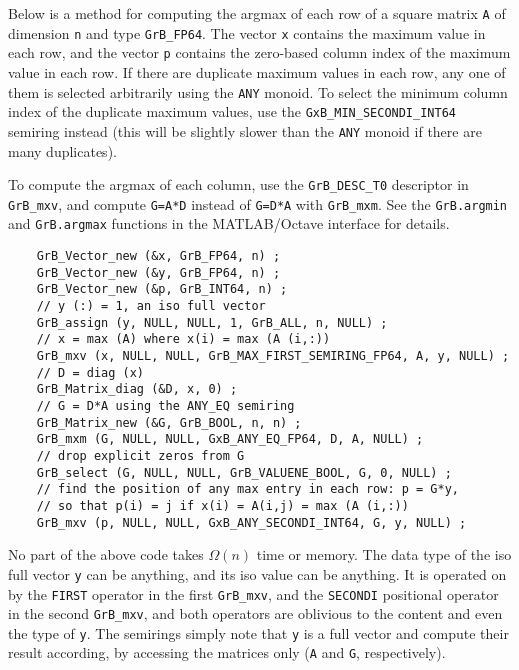 \documentclass[12pt]{article}
\begin{document}
Below is a method for computing the argmax of each row of a square matrix
\verb'A' of dimension \verb'n' and type \verb'GrB_FP64'.  The vector \verb'x'
contains the maximum value in each row, and the vector \verb'p' contains the
zero-based column index of the maximum value in each row.  If there are
duplicate maximum values in each row, any one of them is selected arbitrarily
using the \verb'ANY' monoid.  To select the minimum column index of the
duplicate maximum values, use the \verb'GxB_MIN_SECONDI_INT64' semiring instead
(this will be slightly slower than the \verb'ANY' monoid if there are many
duplicates).

To compute the argmax of each column, use the \verb'GrB_DESC_T0' descriptor
in \verb'GrB_mxv', and compute \verb'G=A*D' instead of \verb'G=D*A' with
\verb'GrB_mxm'.  See the \verb'GrB.argmin' and \verb'GrB.argmax' functions
in the MATLAB/Octave interface for details.


{\footnotesize
\begin{verbatim}
    GrB_Vector_new (&x, GrB_FP64, n) ;
    GrB_Vector_new (&y, GrB_FP64, n) ;
    GrB_Vector_new (&p, GrB_INT64, n) ;
    // y (:) = 1, an iso full vector
    GrB_assign (y, NULL, NULL, 1, GrB_ALL, n, NULL) ;
    // x = max (A) where x(i) = max (A (i,:))
    GrB_mxv (x, NULL, NULL, GrB_MAX_FIRST_SEMIRING_FP64, A, y, NULL) ;
    // D = diag (x)
    GrB_Matrix_diag (&D, x, 0) ;
    // G = D*A using the ANY_EQ semiring
    GrB_Matrix_new (&G, GrB_BOOL, n, n) ;
    GrB_mxm (G, NULL, NULL, GxB_ANY_EQ_FP64, D, A, NULL) ;
    // drop explicit zeros from G
    GrB_select (G, NULL, NULL, GrB_VALUENE_BOOL, G, 0, NULL) ;
    // find the position of any max entry in each row: p = G*y,
    // so that p(i) = j if x(i) = A(i,j) = max (A (i,:))
    GrB_mxv (p, NULL, NULL, GxB_ANY_SECONDI_INT64, G, y, NULL) ; \end{verbatim}}

No part of the above code takes $\Omega(n)$ time or memory.  The data type of
the iso full vector \verb'y' can be anything, and its iso value can be
anything.  It is operated on by the \verb'FIRST' operator in the first
\verb'GrB_mxv', and the \verb'SECONDI' positional operator in the second
\verb'GrB_mxv', and both operators are oblivious to the content and even the
type of \verb'y'.  The semirings simply note that \verb'y' is a full vector and
compute their result according, by accessing the matrices only (\verb'A' and
\verb'G', respectively).
\end{document}

